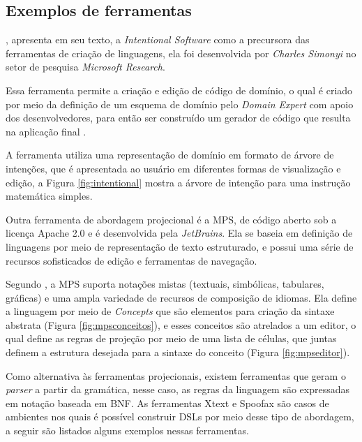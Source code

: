 \newpage
\subsection{Exemplos de ferramentas}
\label{exemplosferramentasdsl}

, apresenta em seu texto, a \textit{Intentional Software} como a precursora das ferramentas de criação de linguagens, ela foi desenvolvida por \textit{Charles Simonyi} no setor de pesquisa \textit{Microsoft Research}. 

Essa ferramenta permite a criação e edição de código de domínio, o qual é criado por meio da definição de um esquema de domínio pelo \textit{Domain Expert} com apoio dos desenvolvedores, para então ser construído um gerador de código que resulta na aplicação final \cite{simonyi2006intentional}. 

A ferramenta utiliza uma representação de domínio em formato de árvore de intenções, que é apresentada ao usuário em diferentes formas de visualização e edição, a Figura \ref{fig:intentional} mostra a árvore de intenção para uma instrução matemática simples.



Outra ferramenta de abordagem projecional é a \gls{MPS}, de código aberto sob a licença Apache 2.0 e é desenvolvida pela \textit{JetBrains}. Ela se baseia em definição de linguagens por meio de representação de texto estruturado, e possui uma série de recursos sofisticados de edição e ferramentas de navegação. 

Segundo , a \gls{MPS} suporta notações mistas (textuais, simbólicas, tabulares, gráficas) e uma ampla variedade de recursos de composição de idiomas. Ela define a linguagem por meio de \textit{Concepts} que são elementos para criação da sintaxe abstrata (Figura \ref{fig:mpsconceitos}), e esses conceitos são atrelados a um editor, o qual define as regras de projeção por meio de uma lista de células, que juntas definem a estrutura desejada para a sintaxe do conceito (Figura \ref{fig:mpseditor}).





\newpage


Como alternativa às ferramentas projecionais, existem ferramentas que geram o \textit{parser} a partir da gramática, nesse caso, as regras da linguagem são expressadas em notação baseada em \gls{BNF}. As ferramentas Xtext e Spoofax são casos de ambientes nos quais é possível construir \gls{DSL}s por meio desse tipo de abordagem, a seguir são listados alguns exemplos nessas ferramentas.


